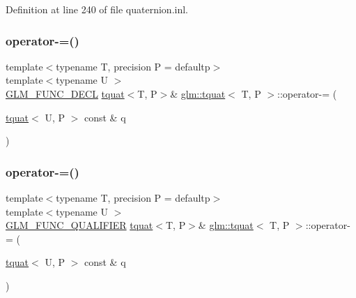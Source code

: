 Definition at line 240 of file quaternion.\+inl.

\mbox{\label{structglm_1_1tquat_aae515aeb43cddd4074a27a74aa516475}} 
\subsubsection{\texorpdfstring{operator-\/=()}{operator-=()}\hspace{0.1cm}{\footnotesize\ttfamily [1/2]}}
{\footnotesize\ttfamily template$<$typename T, precision P = defaultp$>$ \\
template$<$typename U $>$ \\
\mbox{\hyperlink{setup_8hpp_ab2d052de21a70539923e9bcbf6e83a51}{G\+L\+M\+\_\+\+F\+U\+N\+C\+\_\+\+D\+E\+CL}} \mbox{\hyperlink{structglm_1_1tquat}{tquat}}$<$T, P$>$\& \mbox{\hyperlink{structglm_1_1tquat}{glm\+::tquat}}$<$ T, P $>$\+::operator-\/= (\begin{DoxyParamCaption}\item[{\mbox{\hyperlink{structglm_1_1tquat}{tquat}}$<$ U, P $>$ const \&}]{q }\end{DoxyParamCaption})}

\mbox{\label{structglm_1_1tquat_a515509c2907fd29e76b0575271a48c2d}} 
\subsubsection{\texorpdfstring{operator-\/=()}{operator-=()}\hspace{0.1cm}{\footnotesize\ttfamily [2/2]}}
{\footnotesize\ttfamily template$<$typename T, precision P = defaultp$>$ \\
template$<$typename U $>$ \\
\mbox{\hyperlink{setup_8hpp_a33fdea6f91c5f834105f7415e2a64407}{G\+L\+M\+\_\+\+F\+U\+N\+C\+\_\+\+Q\+U\+A\+L\+I\+F\+I\+ER}} \mbox{\hyperlink{structglm_1_1tquat}{tquat}}$<$T, P$>$\& \mbox{\hyperlink{structglm_1_1tquat}{glm\+::tquat}}$<$ T, P $>$\+::operator-\/= (\begin{DoxyParamCaption}\item[{\mbox{\hyperlink{structglm_1_1tquat}{tquat}}$<$ U, P $>$ const \&}]{q }\end{DoxyParamCaption})}




